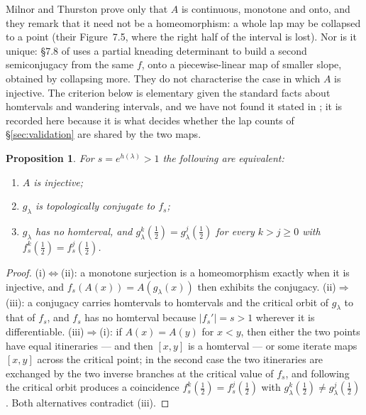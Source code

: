 \documentclass[11pt]{article}
\theoremstyle{plain}
\newtheorem{proposition}[theorem]{Proposition}
\theoremstyle{definition}
\begin{document}
Milnor and Thurston prove only that $A$ is continuous, monotone and onto, and they remark that
it need not be a homeomorphism: a whole lap may be collapsed to a point (their Figure~7.5,
where the right half of the interval is lost).  Nor is it unique: \S7.8 of \cite{MT} uses a
partial kneading determinant to build a second semiconjugacy from the same $f$, onto a
piecewise-linear map of smaller slope, obtained by collapsing more.  They do not
characterise the case in which $A$ is injective.  The criterion below is elementary given the
standard facts about homtervals and wandering intervals, and we have not found it stated in
\cite{MT}; it is recorded here because it is what decides whether the lap counts of
\S\ref{sec:validation} are shared by the two maps.

\begin{proposition}\label{prop:conj}
For $s=e^{h(\lambda)}>1$ the following are equivalent:
\begin{enumerate}[label=(\roman*)]
  \item $A$ is injective;
  \item $g_\lambda$ is topologically conjugate to $f_s$;
  \item $g_\lambda$ has no homterval, and $g_\lambda^k(\tfrac12)=g_\lambda^j(\tfrac12)$ for
        every $k>j\ge0$ with $f_s^k(\tfrac12)=f_s^j(\tfrac12)$.
\end{enumerate}
\end{proposition}

\begin{proof}
(i)$\Leftrightarrow$(ii): a monotone surjection is a homeomorphism exactly when it is
injective, and $f_s(A(x))=A(g_\lambda(x))$ then exhibits the conjugacy.  (ii)$\Rightarrow$(iii):
a conjugacy carries homtervals to homtervals and the critical orbit of $g_\lambda$ to that of
$f_s$, and $f_s$ has no homterval because $|f_s'|=s>1$ wherever it is differentiable.
(iii)$\Rightarrow$(i): if $A(x)=A(y)$ for $x<y$, then either the two points have equal
itineraries --- and then $[x,y]$ is a homterval --- or some iterate maps $[x,y]$ across the
critical point; in the second case the two itineraries are exchanged by the two inverse
branches at the critical value of $f_s$, and following the critical orbit produces a
coincidence $f_s^k(\tfrac12)=f_s^j(\tfrac12)$ with $g_\lambda^k(\tfrac12)\ne
g_\lambda^j(\tfrac12)$.  Both alternatives contradict (iii).
\end{proof}
\end{document}
